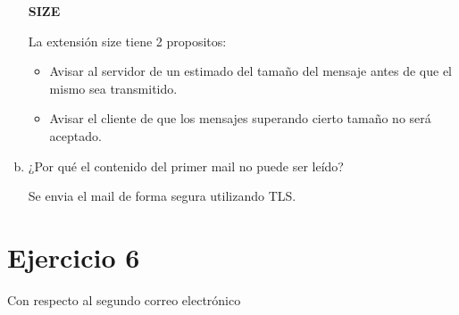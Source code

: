 \documentclass[osajnl,twocolumn,showpacs,superscriptaddress,10pt]{revtex4-1} %
\begin{document}
\begin{enumerate}[a)]
  \textbf{SIZE}
  
  La extensión size tiene 2 propositos:
  
  \begin{itemize}
    \item Avisar al servidor de un estimado del tamaño del mensaje antes de que el mismo sea transmitido.
    \item Avisar el cliente de que los mensajes superando cierto tamaño no será aceptado. \\
  \end{itemize}

  \item ¿Por qué el contenido del primer mail no puede ser leído?

  Se envia el mail de forma segura utilizando TLS. \\
\end{enumerate}

\section{Ejercicio 6}

Con respecto al segundo correo electrónico
\end{document}
